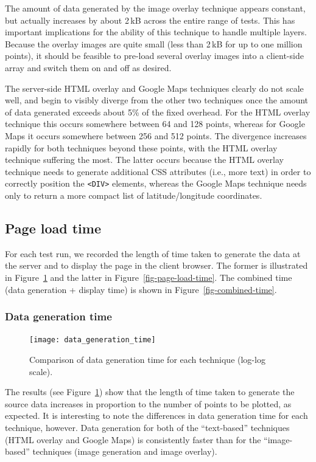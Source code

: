 \documentclass[acmnow]{acmtrans2m}
\begin{document}
The amount of data generated by the image overlay technique appears
constant, but actually increases by about 2\,kB across the entire range
of tests. This has important implications for the ability of this
technique to handle multiple layers. Because the overlay images are
quite small (less than 2\,kB for up to one million points), it should be
feasible to pre-load several overlay images into a client-side array and
switch them on and off as desired.

The server-side HTML overlay and Google Maps techniques clearly do not
scale well, and begin to visibly diverge from the other two techniques
once the amount of data generated exceeds about 5\% of the fixed
overhead. For the HTML overlay technique this occurs somewhere between
64 and 128 points, whereas for Google Maps it occurs somewhere between
256 and 512 points. The divergence increases rapidly for both techniques
beyond these points, with the HTML overlay technique suffering the most.
The latter occurs because the HTML overlay technique needs to generate
additional CSS attributes (i.e., more text) in order to correctly
position the \verb|<DIV>| elements, whereas the Google Maps technique
needs only to return a more compact list of latitude/longitude
coordinates.


\subsection{Page load time}

For each test run, we recorded the length of time taken to generate the
data at the server and to display the page in the client browser. The
former is illustrated in Figure~\ref{fig-data-generation-time} and the
latter in Figure~\ref{fig-page-load-time}. The combined time (data
generation + display time) is shown in Figure~\ref{fig-combined-time}.


\subsubsection{Data generation time}


\begin{figure}
	\centering
	\texttt{[image: data\_generation\_time]}
	\caption{Comparison of data generation time for each technique (log-log scale).}
	\label{fig-data-generation-time}
\end{figure}


The results (see Figure~\ref{fig-data-generation-time}) show that the
length of time taken to generate the source data increases in proportion
to the number of points to be plotted, as expected. It is interesting to
note the differences in data generation time for each technique,
however. Data generation for both of the ``text-based'' techniques (HTML
overlay and Google Maps) is consistently faster than for the
``image-based'' techniques (image generation and image overlay).
\end{document}
